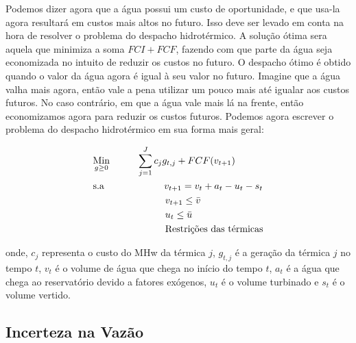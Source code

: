 Podemos dizer agora que a água possui um custo de oportunidade, e que usa-la agora resultará em custos mais altos no futuro. Isso deve ser levado em conta na hora de resolver o problema do despacho hidrotérmico. A solução ótima sera aquela que minimiza a soma $FCI+FCF$, fazendo com que parte da água seja economizada no intuito de reduzir os custos no futuro. O despacho ótimo é obtido quando o valor da água agora é igual à seu valor no futuro. Imagine que a água valha mais agora, então vale a pena utilizar um pouco mais até igualar aos custos futuros. No caso contrário, em que a água vale mais lá na frente, então economizamos agora para reduzir os custos futuros. Podemos agora escrever o problema do despacho hidrotérmico em sua forma mais geral:

\begin{align}
    & \underset{g\geq0}{\text{Min}} \hspace{1cm} \sum_{j=1}^J c_jg_{t,j}+FCF(v_{t+1})  \\
    & \text{s.a}  \hspace{2.2cm} v_{t+1}=v_t+a_t-u_t-s_t   \\
    &             \hspace{2.65cm} v_{t+1}\leq \bar{v} \\
    &             \hspace{2.65cm} u_t\leq \bar{u} \\
    &             \hspace{2.65cm} \text{Restrições das térmicas}
\end{align}

onde, $c_j$ representa o custo do MHw da térmica $j$, $g_{t,j}$ é a geração da térmica $j$ no tempo $t$, $v_t$ é o volume de água que chega no início do tempo $t$, $a_t$ é a água que chega ao reservatório devido a fatores exógenos, $u_t$ é o volume turbinado e $s_t$ é o volume vertido. 

\subsection{Incerteza na Vazão}

